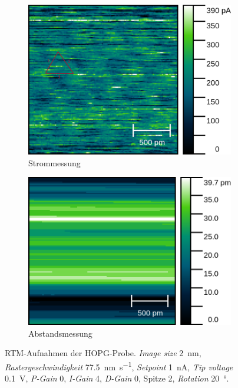 \begin{figure}
	\centering
	\begin{subfigure}{0.45\linewidth}
		\centering
		\includegraphics[width=\linewidth]{figs/HOPG10628_lines.png}
		\caption{Strommessung}
		\label{fig:hopg_rtm_4nm_2_cur}
	\end{subfigure}
	\hspace{.5cm}
	\begin{subfigure}{0.45\linewidth}
		\centering
		\includegraphics[width=\linewidth]{figs/HOPG10628_height.png}
		\caption{Abstandsmessung}
		\label{fig:hopg_rtm_4nm_2_height}
	\end{subfigure}
	\caption{RTM-Aufnahmen der HOPG-Probe. \textit{Image size} \SI{2}{\nano \meter},
	\textit{Rastergeschwindigkeit} \SI{77.5}{\nm\per \second}, \textit{Setpoint} \SI{1}{\nano \ampere},
	\textit{Tip voltage} \SI{0.1}{\volt}, \textit{P-Gain} \num{0}, \textit{I-Gain} \num{4},
	\textit{D-Gain} \num{0}, Spitze 2, \textit{Rotation} \SI{20}{\degree}.}
	\label{fig:hopg_rtm_2}
\end{figure}
